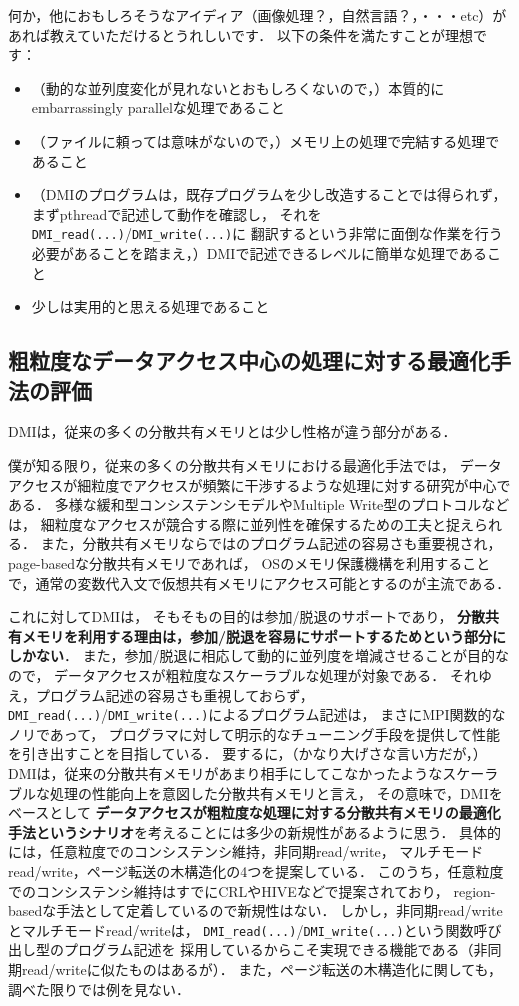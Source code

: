 \documentclass[10pt]{jsarticle}
\begin{document}
何か，他におもしろそうなアイディア（画像処理？，自然言語？，・・・etc）があれば教えていただけるとうれしいです．
以下の条件を満たすことが理想です：

\begin{itemize}
\item （動的な並列度変化が見れないとおもしろくないので，）本質的にembarrassingly parallelな処理であること
\item （ファイルに頼っては意味がないので，）メモリ上の処理で完結する処理であること
\item （DMIのプログラムは，既存プログラムを少し改造することでは得られず，
まずpthreadで記述して動作を確認し，
それを\texttt{DMI\_read(...)}/\texttt{DMI\_write(...)}に
翻訳するという非常に面倒な作業を行う必要があることを踏まえ，）DMIで記述できるレベルに簡単な処理であること
\item 少しは実用的と思える処理であること
\end{itemize}

\subsection{粗粒度なデータアクセス中心の処理に対する最適化手法の評価}

DMIは，従来の多くの分散共有メモリとは少し性格が違う部分がある．

僕が知る限り，従来の多くの分散共有メモリにおける最適化手法では，
データアクセスが細粒度でアクセスが頻繁に干渉するような処理に対する研究が中心である．
多様な緩和型コンシステンシモデルやMultiple Write型のプロトコルなどは，
細粒度なアクセスが競合する際に並列性を確保するための工夫と捉えられる．
また，分散共有メモリならではのプログラム記述の容易さも重要視され，
page-basedな分散共有メモリであれば，
OSのメモリ保護機構を利用することで，通常の変数代入文で仮想共有メモリにアクセス可能とするのが主流である．

これに対してDMIは，
そもそもの目的は参加/脱退のサポートであり，
\textbf{分散共有メモリを利用する理由は，参加/脱退を容易にサポートするためという部分にしかない}．
また，参加/脱退に相応して動的に並列度を増減させることが目的なので，
データアクセスが粗粒度なスケーラブルな処理が対象である．
それゆえ，プログラム記述の容易さも重視しておらず，
\texttt{DMI\_read(...)}/\texttt{DMI\_write(...)}によるプログラム記述は，
まさにMPI関数的なノリであって，
プログラマに対して明示的なチューニング手段を提供して性能を引き出すことを目指している．
要するに，（かなり大げさな言い方だが，）
DMIは，従来の分散共有メモリがあまり相手にしてこなかったようなスケーラブルな処理の性能向上を意図した分散共有メモリと言え，
その意味で，DMIをベースとして
\textbf{データアクセスが粗粒度な処理に対する分散共有メモリの最適化手法というシナリオ}を考えることには多少の新規性があるように思う．
具体的には，任意粒度でのコンシステンシ維持，非同期read/write，
マルチモードread/write，ページ転送の木構造化の4つを提案している．
このうち，任意粒度でのコンシステンシ維持はすでにCRLやHIVEなどで提案されており，
region-basedな手法として定着しているので新規性はない．
しかし，非同期read/writeとマルチモードread/writeは，
\texttt{DMI\_read(...)}/\texttt{DMI\_write(...)}という関数呼び出し型のプログラム記述を
採用しているからこそ実現できる機能である（非同期read/writeに似たものはあるが）．
また，ページ転送の木構造化に関しても，調べた限りでは例を見ない．
\end{document}
